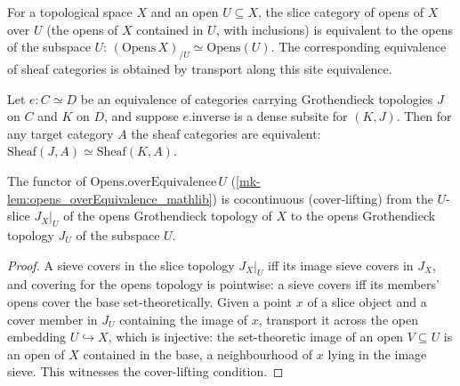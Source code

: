 \begin{lemma}
  \label{mk-lem:opens_overEquivalence_mathlib}
  \mathlibok

  For a topological space \(X\) and an open \(U \subseteq X\), the slice category of opens of
  \(X\) over \(U\) (the opens of \(X\) contained in \(U\), with inclusions) is equivalent to the
  opens of the subspace \(U\):
  \((\mathrm{Opens}\,X)_{/U} \simeq \mathrm{Opens}(U)\). The corresponding
  equivalence of sheaf categories is obtained by transport along this site equivalence.
\end{lemma}

\begin{lemma}
  \label{mk-lem:equivalence_sheafCongr_mathlib}
  \mathlibok

  Let \(e : C \simeq D\) be an equivalence of categories carrying Grothendieck topologies \(J\)
  on \(C\) and \(K\) on \(D\), and suppose \(e.\mathrm{inverse}\) is a dense subsite for
  \((K, J)\). Then for any target category \(A\) the sheaf categories are equivalent:
  \(\mathrm{Sheaf}(J, A) \simeq \mathrm{Sheaf}(K, A)\).
\end{lemma}

\begin{lemma}\label{mk-lem:overEquivalence_functor_isCocontinuous}
  \leanok

  The functor of \(\mathrm{Opens.overEquivalence}\,U\) (\ref{mk-lem:opens_overEquivalence_mathlib})
  is cocontinuous (cover-lifting) from the \(U\)-slice \(J_X|_U\) of the opens Grothendieck
  topology of \(X\) to the opens Grothendieck topology \(J_U\) of the subspace \(U\).
\end{lemma}
\begin{proof}
  A sieve covers in the slice topology \(J_X|_U\) iff its image sieve covers in \(J_X\), and
  covering for the opens topology is pointwise: a sieve covers iff its members' opens cover the
  base set-theoretically. Given a point \(x\) of a slice object and a cover member in \(J_U\)
  containing the image of \(x\), transport it across the open embedding \(U \hookrightarrow X\),
  which is injective: the set-theoretic image of an open \(V \subseteq U\) is an open of \(X\)
  contained in the base, a neighbourhood of \(x\) lying in the image sieve. This witnesses the
  cover-lifting condition.
\end{proof}

